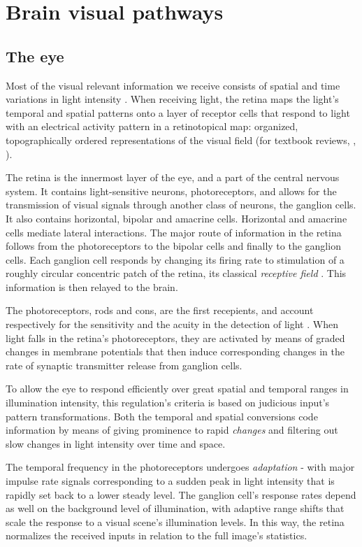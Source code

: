 \section{Brain visual pathways}
\label{sec:sectionb}

\subsection{The eye}

Most of the visual relevant information we receive consists of spatial and time variations in light intensity \cite{Green}. When receiving light, the retina maps the light's temporal and spatial patterns onto a layer of receptor cells that respond to light with an electrical activity pattern in a retinotopical map: organized, topographically ordered representations of the visual field (for textbook reviews, \cite{Purves}, \cite{Kandel}).  

The retina is the innermost layer of the eye, and a part of the central nervous system. It contains light-sensitive neurons, photoreceptors, and allows for the transmission of visual signals through another class of neurons, the ganglion cells. It also contains horizontal, bipolar and amacrine cells. Horizontal and amacrine cells mediate lateral interactions. The major route of information in the retina follows from the photoreceptors to the bipolar cells and finally to the ganglion cells. Each ganglion cell responds by changing its firing rate to stimulation of a roughly circular concentric patch of the retina, its classical \textit{receptive field} \cite{Kuffler1953}. This information is then relayed to the brain.

The photoreceptors, rods and cons, are the first recepients, and account respectively for the sensitivity and the acuity in the detection of light \cite{Green}.
When light falls in the retina's photoreceptors, they are activated by means of graded changes in membrane potentials that then induce corresponding changes in the rate of synaptic transmitter release from ganglion cells. 

To allow the eye to respond efficiently over great spatial and temporal ranges in illumination intensity, this regulation's criteria is based on judicious input's pattern transformations. Both the temporal and spatial conversions code information by means of giving prominence to rapid \textit{changes} and filtering out slow changes in light intensity over time and space.

The temporal frequency in the photoreceptors undergoes \textit{adaptation} - with major impulse rate signals corresponding to a sudden peak in light intensity that is rapidly set back to a lower steady level. The ganglion cell's response rates depend as well on the background level of illumination, with adaptive range shifts that scale the response to a visual scene's illumination levels. In this way, the retina normalizes the received inputs in relation to the full image's statistics. 

